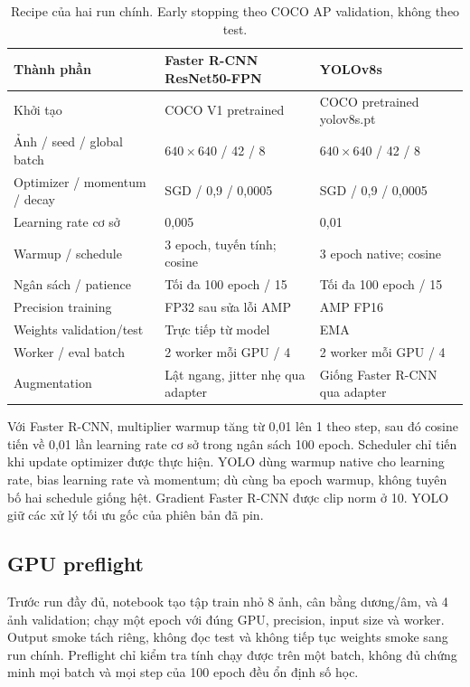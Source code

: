 \documentclass[a4paper,10pt,twocolumn]{article}
\newcommand{\FR}{Faster R-CNN}
\begin{document}
\begin{table}[t]
\centering\small
\caption{Recipe của hai run chính. Early stopping theo COCO AP validation, không theo test.}
\label{tab:recipe}
\begin{tabular}{lll}
\toprule
Thành phần & Faster R-CNN ResNet50-FPN & YOLOv8s \\
\midrule
Khởi tạo & COCO V1 pretrained & COCO pretrained yolov8s.pt \\
Ảnh / seed / global batch & $640\times640$ / 42 / 8 & $640\times640$ / 42 / 8 \\
Optimizer / momentum / decay & SGD / 0,9 / 0,0005 & SGD / 0,9 / 0,0005 \\
Learning rate cơ sở & 0,005 & 0,01 \\
Warmup / schedule & 3 epoch, tuyến tính; cosine & 3 epoch native; cosine \\
Ngân sách / patience & Tối đa 100 epoch / 15 & Tối đa 100 epoch / 15 \\
Precision training & FP32 sau sửa lỗi AMP & AMP FP16 \\
Weights validation/test & Trực tiếp từ model & EMA \\
Worker / eval batch & 2 worker mỗi GPU / 4 & 2 worker mỗi GPU / 4 \\
Augmentation & Lật ngang, jitter nhẹ qua adapter & Giống Faster R-CNN qua adapter \\
\bottomrule
\end{tabular}
\end{table}

Với \FR{}, multiplier warmup tăng từ 0,01 lên 1 theo step, sau đó cosine tiến về
0,01 lần learning rate cơ sở trong ngân sách 100 epoch. Scheduler chỉ tiến khi update
optimizer được thực hiện. YOLO dùng warmup native cho learning rate, bias learning rate
và momentum; dù cùng ba epoch warmup, không tuyên bố hai schedule giống hệt.
Gradient \FR{} được clip norm ở 10. YOLO giữ các xử lý tối ưu gốc của phiên bản đã pin.

\subsection{GPU preflight}
Trước run đầy đủ, notebook tạo tập train nhỏ 8 ảnh, cân bằng dương/âm, và 4 ảnh
validation; chạy một epoch với đúng GPU, precision, input size và worker. Output smoke
tách riêng, không đọc test và không tiếp tục weights smoke sang run chính.
Preflight chỉ kiểm tra tính chạy được trên một batch, không đủ chứng minh mọi batch
và mọi step của 100 epoch đều ổn định số học.
\end{document}
